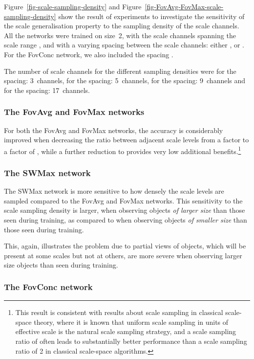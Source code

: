 \documentclass[twocolumn,runningheads]{svjour3}
\begin{document}
Figure~\ref{fig-scale-sampling-density} and
Figure~\ref{fig-FovAvg-FovMax-scale-sampling-density} show the result of 
experiments to investigate the sensitivity of the scale generalisation
property to the sampling density of the scale channels.
All the networks were trained on size~2, with the scale channels spanning
the scale range , and with a varying spacing between the
scale channels: either ,  or .
For the FovConc network, we also included the spacing .

The number of scale channels for the different sampling densities were
for the  spacing: 3~channels, for the  spacing:  5~channels,
for the  spacing: 9~channels and for the  spacing:
17~channels.

\subsubsection{The FovAvg and FovMax networks}

For both the FovAvg and FovMax networks, the accuracy is
considerably improved when decreasing the ratio between adjacent
scale levels from a factor  to a factor of ,
while a further reduction to  
provides very low additional benefits.\footnote{This result is consistent with results about scale sampling
  in classical scale-space theory, where it is known that uniform
  scale sampling in units of effective scale 
  \cite{Lin92-PAMI} is the
  natural scale sampling strategy, and a scale sampling ratio of
   often leads to substantially better performance than a scale
  sampling ratio of 2 in classical scale-space algorithms.}


\subsubsection{The SWMax network}

The SWMax network is more sensitive to how densely the scale levels are
sampled compared to the FovAvg and FovMax networks. This
sensitivity to the scale sampling density is larger, when observing
objects {\em of larger size\/} than those seen during training, as
compared to when observing objects {\em of smaller size\/} than
those seen during training.

This, again, illustrates the problem due to
partial views of objects, which will be present at some scales but not
at others, are more severe when observing larger size objects than
seen during training.

\subsubsection{The FovConc network}
\end{document}
